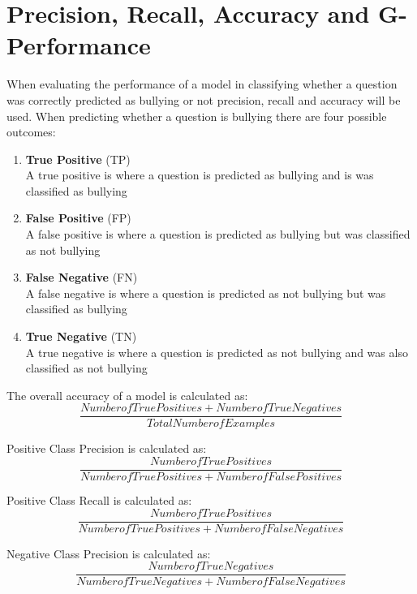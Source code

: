 \section{Precision, Recall, Accuracy and G-Performance}
\label{section:2.3}

When evaluating the performance of a model in classifying whether a question was correctly predicted as bullying or not precision, recall and accuracy will be used. When predicting whether a question is bullying there are four possible outcomes:

\begin{enumerate}

	\item \textbf{True Positive} (TP)\\
	A true positive is where a question is predicted as bullying and is was classified as bullying
	\item \textbf{False Positive} (FP) \\
	A false positive is where a question is predicted as bullying but was classified as not bullying
	\item \textbf{False Negative} (FN)\\
	A false negative is where a question is predicted as not bullying but was classified as bullying
	\item \textbf{True Negative} (TN)\\
	A true negative is where a question is predicted as not bullying and was also classified as not bullying

\end{enumerate}

The overall accuracy of a model is calculated as:
\begin{equation}
     \frac{Number of True Positives + Number of True Negatives}{Total Number of Examples}
\end{equation}

Positive Class Precision is calculated as:
\begin{equation}
     \frac{Number of True Positives}{Number of True Positives + Number of False Positives}
\end{equation}

Positive Class Recall is calculated as:
\begin{equation}
     \frac{Number of True Positives}{Number of True Positives + Number of False Negatives}
\end{equation} 

Negative Class Precision is calculated as:
\begin{equation}
     \frac{Number of True Negatives}{Number of True Negatives + Number of False Negatives}
\end{equation}

